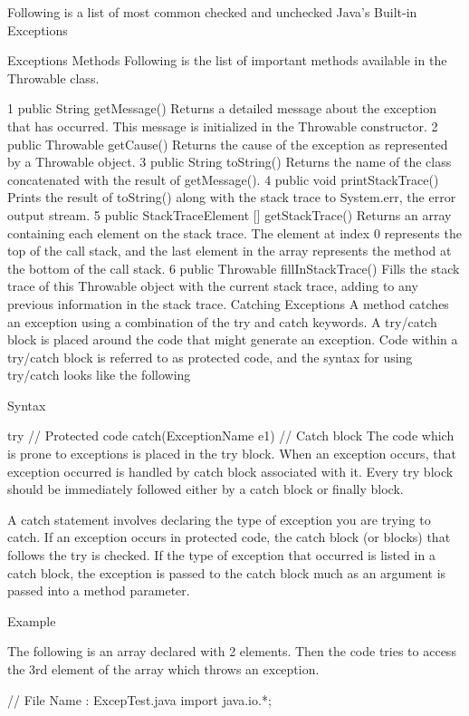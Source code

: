 Following is a list of most common checked and unchecked Java's Built-in Exceptions

Exceptions Methods
Following is the list of important methods available in the Throwable class.

1	public String getMessage()
Returns a detailed message about the exception that has occurred. This message is initialized in the Throwable constructor.
2	public Throwable getCause()
Returns the cause of the exception as represented by a Throwable object.
3	public String toString()
Returns the name of the class concatenated with the result of getMessage().
4	public void printStackTrace()
Prints the result of toString() along with the stack trace to System.err, the error output stream.
5	public StackTraceElement [] getStackTrace()
Returns an array containing each element on the stack trace. The element at index 0 represents the top of the call stack, and the last element in the array represents the method at the bottom of the call stack.
6	public Throwable fillInStackTrace()
Fills the stack trace of this Throwable object with the current stack trace, adding to any previous information in the stack trace.
Catching Exceptions
A method catches an exception using a combination of the try and catch keywords. A try/catch block is placed around the code that might generate an exception. Code within a try/catch block is referred to as protected code, and the syntax for using try/catch looks like the following

Syntax

try {
   // Protected code
}catch(ExceptionName e1) {
   // Catch block
}
The code which is prone to exceptions is placed in the try block. When an exception occurs, that exception occurred is handled by catch block associated with it. Every try block should be immediately followed either by a catch block or finally block.

A catch statement involves declaring the type of exception you are trying to catch. If an exception occurs in protected code, the catch block (or blocks) that follows the try is checked. If the type of exception that occurred is listed in a catch block, the exception is passed to the catch block much as an argument is passed into a method parameter.

Example

The following is an array declared with 2 elements. Then the code tries to access the 3rd element of the array which throws an exception.

// File Name : ExcepTest.java
import java.io.*;

